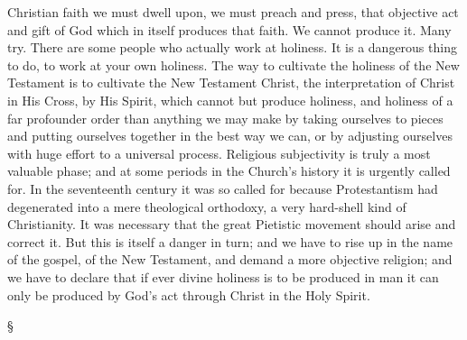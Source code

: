 \documentclass[12pt,a5paper,twoside,titlepage]{book}
\begin{document}
Christian faith we must dwell upon, we must 
preach and press, that objective act and gift of 
God which in itself produces that faith. We 
cannot produce it. Many try. There are some 
people who actually work at holiness. It is a 
dangerous thing to do, to work at your own 
holiness. The way to cultivate the holiness of 
the New Testament is to cultivate the New Testament 
Christ, the interpretation of Christ in 
His Cross, by His Spirit, which cannot but 
produce holiness, and holiness of a far profounder 
order than anything we may make 
by taking ourselves to pieces and putting 
ourselves together in the best way we can, 
or by adjusting ourselves with huge effort 
to a universal process. Religious subjectivity 
is truly a most valuable phase; and at some 
periods in the Church's history it is urgently 
called for. In the seventeenth century it was 
so called for because Protestantism had degenerated 
into a mere theological orthodoxy, 
a very hard-shell kind of Christianity. It was 
necessary that the great Pietistic movement 
should arise and correct it. But this is itself a 
danger in turn; and we have to rise up in the 
name of the gospel, of the New Testament, and 
demand a more objective religion; and we have 
to declare that if ever divine holiness is to be 
produced in man it can only be produced by 
God's act through Christ in the Holy Spirit.   

\begin{center}
\S
\end{center}
\end{document}

